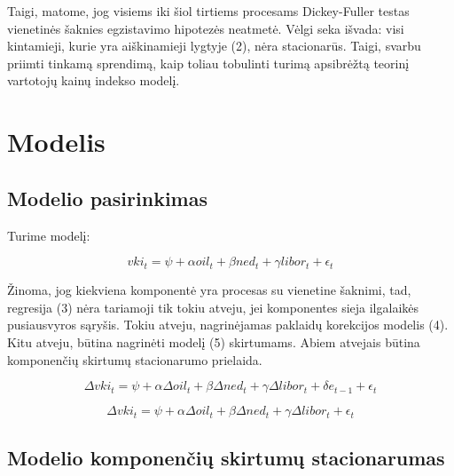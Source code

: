 \documentclass[a4paper]{article}
\begin{document}
Taigi, matome, jog visiems iki šiol tirtiems procesams Dickey-Fuller testas vienetinės šaknies egzistavimo hipotezės neatmetė. Vėlgi seka išvada: visi kintamieji, kurie yra aiškinamieji lygtyje (2), nėra stacionarūs. Taigi, svarbu priimti tinkamą sprendimą, kaip toliau tobulinti turimą apsibrėžtą teorinį vartotojų kainų indekso modelį.
\newpage \section{Modelis}
\subsection{Modelio pasirinkimas} \indent

Turime modelį:

\begin{equation}
\textit{vki}_t = \psi + \alpha\textit{oil}_t + \beta\textit{ned}_t + \gamma\textit{libor}_t + \epsilon_t
\end{equation}\indent

Žinoma, jog kiekviena komponentė yra procesas su vienetine šaknimi, tad, regresija (3) nėra tariamoji tik tokiu atveju, jei komponentes sieja ilgalaikės pusiausvyros sąryšis. Tokiu atveju, nagrinėjamas paklaidų korekcijos modelis (4). Kitu atveju, būtina nagrinėti modelį (5) skirtumams. Abiem atvejais būtina komponenčių skirtumų stacionarumo prielaida.

\begin{equation}
\Delta\textit{vki}_t = \psi + \alpha\Delta\textit{oil}_t + \beta\Delta\textit{ned}_t + \gamma\Delta\textit{libor}_t + \delta\textit{e}_{t-1} + \epsilon_t %
\end{equation}

\begin{equation}
\Delta\textit{vki}_t = \psi + \alpha\Delta\textit{oil}_t + \beta\Delta\textit{ned}_t + \gamma\Delta\textit{libor}_t + \epsilon_t
\end{equation}

\newpage \subsection{Modelio komponenčių skirtumų stacionarumas} \indent
\end{document}
